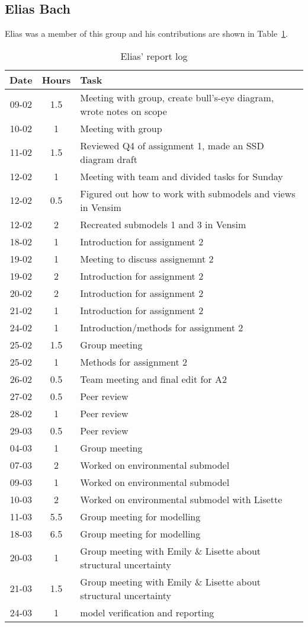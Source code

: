 
\subsection{Elias Bach}
Elias was a member of this group and his contributions are shown in Table~\ref{tab:elias_log}. 
\begin{longtable}[c]{c|c|m{35em}}
\caption{Elias' report log}
\label{tab:elias_log}\\
\textbf{Date}& \textbf{Hours} & \textbf{Task} \\
\hline
\endfirsthead
%
\endhead
%
09-02 & 1.5 & Meeting with group, create bull's-eye diagram, wrote notes on scope\\
10-02 & 1 & Meeting with group \\
11-02 & 1.5 & Reviewed Q4 of assignment 1, made an SSD diagram draft \\
12-02 & 1 & Meeting with team and divided tasks for Sunday\\ 
12-02 & 0.5 & Figured out how to work with submodels and views in Vensim \\
12-02 & 2 & Recreated submodels 1 and 3 in Vensim \\
18-02 & 1 & Introduction for assignment 2 \\
19-02 & 1 & Meeting to discuss assignemnt 2\\
19-02 & 2 & Introduction for assignment 2 \\
20-02 & 2 & Introduction for assignment 2 \\
21-02 & 1 & Introduction for assignment 2 \\
24-02 & 1 & Introduction/methods for assignment 2 \\
25-02 & 1.5 & Group meeting \\
25-02 & 1 & Methods for assignment 2 \\
26-02 & 0.5 & Team meeting and final edit for A2 \\
27-02 & 0.5 & Peer review \\
28-02 & 1 & Peer review \\
29-03 & 0.5 & Peer review \\
04-03 & 1 & Group meeting \\
07-03 & 2 & Worked on environmental submodel \\
09-03 & 1 & Worked on environmental submodel \\
10-03 & 2 & Worked on environmental submodel with Lisette \\
11-03 & 5.5 & Group meeting for modelling \\
18-03 & 6.5 & Group meeting for modelling \\
20-03 & 1 & Group meeting with Emily \& Lisette about structural uncertainty \\
21-03 & 1.5 & Group meeting with Emily \& Lisette about structural uncertainty \\
24-03 & 1 & model verification and reporting
\end{longtable}

